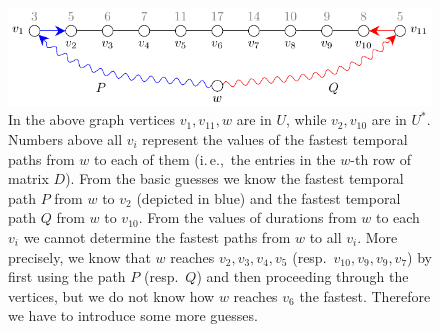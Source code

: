\documentclass[a4paper,UKenglish,cleveref, autoref, thm-restate]{lipics-v2021}
\newcommand{\ie}{i.\,e.,\ }
\newcounter{guesscounter}
\begin{document}
\setcounter{guesscounter}{6}

\begin{figure}[t]
	\centering
	\includegraphics[width=0.75\columnwidth]{fig-exampleg10}
	\caption{In the above graph vertices $v_1, v_{11}, w$ are in $U$, while $v_2, v_{10}$ are in $U^*$. 
		Numbers above all $v_i$ represent the values of the fastest temporal paths from $w$ to each of them (\ie the entries in the $w$-th row of matrix $D$).
		From the basic guesses we know the fastest temporal path $P$ from $w$ to $v_2$ (depicted in blue) and the fastest temporal path $Q$ from $w$ to $v_{10}$.
		From the values of durations from $w$ to each $v_i$ we cannot 
		determine the fastest paths from $w$ to all $v_i$.
		More precisely, we know that $w$ reaches $v_2, v_3, v_4, v_5$ (resp.~$v_{10}, v_{9}, v_{9}, v_{7}$) 
		by first using the path $P$ (resp.~$Q$) and then proceeding through the vertices,
		but we do not know how $w$ reaches $v_6$ the fastest.
		Therefore we have to introduce some more guesses.
  \label{fig:guesses-advanced}}
\end{figure}
\end{document}
